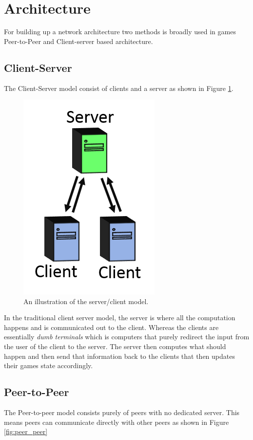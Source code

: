 \section{Architecture}
For building up a network architecture two methods is broadly used in games Peer-to-Peer and Client-server based architecture. 


\subsection{Client-Server}
The Client-Server model consist of clients and a server as shown in Figure \ref{fig:server_client}. 

\begin{figure}[H]
\centering
\includegraphics[scale=1]{figures/network/server_client}
\caption{An illustration of the server/client model.}
\label{fig:server_client}
\end{figure}

In the traditional client server model, the server is where all the computation happens and is communicated out to the client.
Whereas the clients are essentially \textit{dumb terminals} which is computers that purely redirect the input from the user of the client to the server. 
The server then computes what should happen and then send that information back to the clients that then updates their games state accordingly.

\subsection{Peer-to-Peer}
The Peer-to-peer model consists purely of peers with no dedicated server.
This means peers can communicate directly with other peers as shown in Figure \ref{fig:peer_peer}

